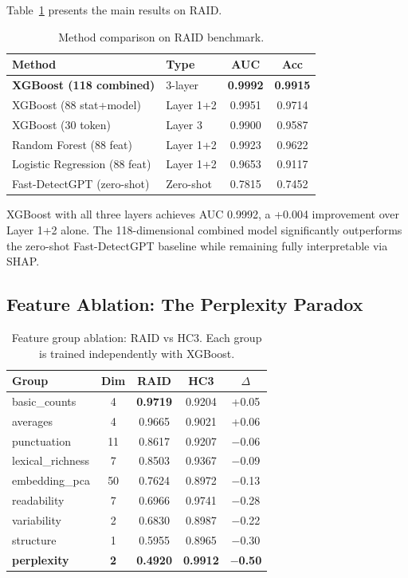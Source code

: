 \documentclass[sigconf,nonacm]{acmart}
\begin{document}
Table~\ref{tab:main} presents the main results on RAID.

\begin{table}[t]
\caption{Method comparison on RAID benchmark.}
\label{tab:main}
\small
\begin{tabular}{llcc}
\toprule
\textbf{Method} & \textbf{Type} & \textbf{AUC} & \textbf{Acc} \\
\midrule
\textbf{XGBoost (118 combined)}    & 3-layer     & \textbf{0.9992} & \textbf{0.9915} \\
XGBoost (88 stat+model)            & Layer 1+2   & 0.9951 & 0.9714 \\
XGBoost (30 token)                 & Layer 3     & 0.9900 & 0.9587 \\
Random Forest (88 feat)            & Layer 1+2   & 0.9923 & 0.9622 \\
Logistic Regression (88 feat)      & Layer 1+2   & 0.9653 & 0.9117 \\
Fast-DetectGPT (zero-shot)         & Zero-shot   & 0.7815 & 0.7452 \\
\bottomrule
\end{tabular}
\end{table}

XGBoost with all three layers achieves AUC 0.9992, a +0.004 improvement over Layer 1+2 alone. The 118-dimensional combined model significantly outperforms the zero-shot Fast-DetectGPT baseline while remaining fully interpretable via SHAP.

\subsection{Feature Ablation: The Perplexity Paradox}

\begin{table}[t]
\caption{Feature group ablation: RAID vs HC3. Each group is trained independently with XGBoost.}
\label{tab:ablation}
\small
\begin{tabular}{lcccc}
\toprule
\textbf{Group} & \textbf{Dim} & \textbf{RAID} & \textbf{HC3} & \textbf{$\Delta$} \\
\midrule
basic\_counts     & 4  & \textbf{0.9719} & 0.9204 & +0.05 \\
averages          & 4  & 0.9665 & 0.9021 & +0.06 \\
punctuation       & 11 & 0.8617 & 0.9207 & $-$0.06 \\
lexical\_richness  & 7  & 0.8503 & 0.9367 & $-$0.09 \\
embedding\_pca    & 50 & 0.7624 & 0.8972 & $-$0.13 \\
readability       & 7  & 0.6966 & 0.9741 & $-$0.28 \\
variability       & 2  & 0.6830 & 0.8987 & $-$0.22 \\
structure         & 1  & 0.5955 & 0.8965 & $-$0.30 \\
\textbf{perplexity} & \textbf{2} & \textbf{0.4920} & \textbf{0.9912} & \textbf{$-$0.50} \\
\bottomrule
\end{tabular}
\end{table}
\end{document}
